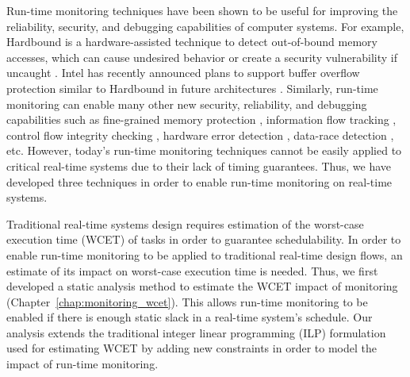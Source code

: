 Run-time monitoring techniques have been shown to be useful for improving the
reliability, security, and debugging capabilities of computer systems. For
example, Hardbound is a hardware-assisted technique to detect out-of-bound
memory accesses, which can cause undesired behavior or create a security
vulnerability if uncaught \cite{hardbound-asplos08}. Intel has recently
announced plans to support buffer overflow protection similar to Hardbound in
future architectures \cite{intel-mpx}. Similarly, run-time monitoring can
enable many other new security, reliability, and debugging capabilities such as
fine-grained memory protection \cite{mondrian-asplos02}, information flow
tracking \cite{dift-asplos04, testudo-micro08}, control flow integrity checking
\cite{hafix-dac15}, hardware error detection \cite{argus-micro07}, data-race
detection \cite{radish-isca12, cord-hpca06}, etc.  
However, today's run-time monitoring techniques cannot be easily applied
to critical real-time systems due to their lack of timing guarantees. Thus, we
have developed three techniques in order to enable run-time monitoring on
real-time systems.


Traditional real-time systems design requires estimation of the worst-case
execution time (WCET) of tasks in order to guarantee schedulability. In order to
enable run-time monitoring to be applied to traditional real-time design flows,
an estimate of its impact on worst-case execution time is needed. Thus, we
first developed a static analysis method to estimate the WCET impact of monitoring
(Chapter~\ref{chap:monitoring_wcet}). This allows run-time monitoring to be
enabled if there is enough static slack in a real-time system's schedule.
Our analysis extends the traditional integer linear programming
(ILP) formulation used for estimating WCET by adding new constraints in order
to model the impact of run-time monitoring.

